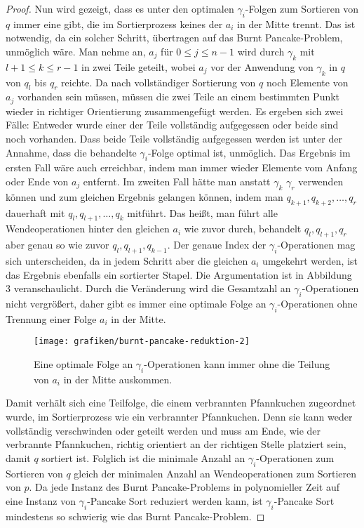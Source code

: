 \documentclass[a4paper, 11pt, ngerman]{article}
\begin{document}
\begin{proof}
    Nun wird gezeigt, dass es unter den optimalen $\gamma_i$-Folgen zum Sortieren von $q$ immer eine gibt, die im Sortierprozess keines der $a_i$ in der Mitte trennt. Das ist notwendig, da ein solcher Schritt, übertragen auf das Burnt Pancake-Problem, unmöglich wäre. Man nehme an, $a_j$ für $0 \le j \le n - 1$ wird durch $\gamma_k$ mit $l + 1 \le k \le r-1$ in zwei Teile geteilt, wobei $a_j$ vor der Anwendung von $\gamma_k$ in $q$ von $q_l$ bis $q_r$ reichte. Da nach vollständiger Sortierung von $q$ noch Elemente von $a_j$ vorhanden sein müssen, müssen die zwei Teile an einem bestimmten Punkt wieder in richtiger Orientierung zusammengefügt werden. Es ergeben sich zwei Fälle: Entweder wurde einer der Teile vollständig aufgegessen oder beide sind noch vorhanden. Dass beide Teile vollständig aufgegessen werden ist unter der Annahme, dass die behandelte $\gamma_i$-Folge optimal ist, unmöglich. Das Ergebnis im ersten Fall wäre auch erreichbar, indem man immer wieder Elemente vom Anfang oder Ende von $a_j$ entfernt. Im zweiten Fall hätte man anstatt $\gamma_k$ $\gamma_r$ verwenden können und zum gleichen Ergebnis gelangen können, indem man $q_{k + 1}, q_{k + 2}, \dots, q_r$ dauerhaft mit $q_l, q_{l+1}, \dots, q_{k}$ mitführt. Das heißt, man führt alle Wendeoperationen hinter den gleichen $a_i$ wie zuvor durch, behandelt $q_l, q_{l+1}, q_r$ aber genau so wie zuvor $q_l, q_{l+1}, q_{k-1}$. Der genaue Index der $\gamma_i$-Operationen mag sich unterscheiden, da in jedem Schritt aber die gleichen $a_i$ umgekehrt werden, ist das Ergebnis ebenfalls ein sortierter Stapel. Die Argumentation ist in Abbildung 3 veranschaulicht. Durch die Veränderung wird die Gesamtzahl an $\gamma_i$-Operationen nicht vergrößert, daher gibt es immer eine optimale Folge an $\gamma_i$-Operationen ohne Trennung einer Folge $a_i$ in der Mitte.

    \begin{figure}[H]
        \centering
        \texttt{[image: grafiken/burnt-pancake-reduktion-2]}
        \caption{Eine optimale Folge an $\gamma_i$-Operationen kann immer ohne die Teilung von $a_i$ in der Mitte auskommen.}
    \end{figure}

    Damit verhält sich eine Teilfolge, die einem verbrannten Pfannkuchen zugeordnet wurde, im Sortierprozess wie ein verbrannter Pfannkuchen. Denn sie kann weder vollständig verschwinden oder geteilt werden und muss am Ende, wie der verbrannte Pfannkuchen, richtig orientiert an der richtigen Stelle platziert sein, damit $q$ sortiert ist. Folglich ist die minimale Anzahl an $\gamma_i$-Operationen zum Sortieren von $q$ gleich der minimalen Anzahl an Wendeoperationen zum Sortieren von $p$. Da jede Instanz des Burnt Pancake-Problems in polynomieller Zeit auf eine Instanz von $\gamma_i$-Pancake Sort reduziert werden kann, ist $\gamma_i$-Pancake Sort mindestens so schwierig wie das Burnt Pancake-Problem.
\end{proof}
\end{document}
